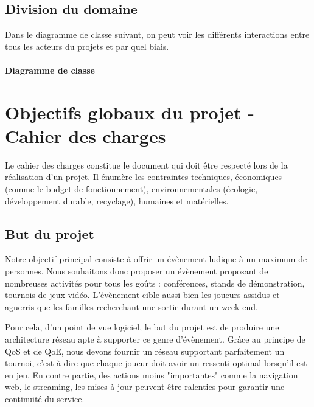 \documentclass[french]{article}
\begin{document}

\subsection{Division du domaine}

Dans le diagramme de classe suivant, on peut voir les différents interactions entre tous les acteurs du projets et par quel biais.

\paragraph{Diagramme de classe}



\newpage
\section{Objectifs globaux du projet - Cahier des charges}

Le cahier des charges constitue le document qui doit être respecté lors de la réalisation d'un projet. Il énumère les contraintes techniques, économiques (comme le budget de fonctionnement), environnementales (écologie, développement durable, recyclage), humaines et matérielles.

\subsection{But du projet}

Notre objectif principal consiste à offrir un évènement ludique à un maximum de personnes. Nous souhaitons donc proposer un évènement proposant de nombreuses activités pour tous les goûts : conférences, stands de démonstration, tournois de jeux vidéo. L'évènement cible aussi bien les joueurs assidus et aguerris que les familles recherchant une sortie durant un week-end.

Pour cela, d'un point de vue logiciel, le but du projet est de produire une architecture réseau apte à supporter ce genre d'évènement. Grâce au principe de QoS et de QoE, nous devons fournir un réseau supportant parfaitement un tournoi, c'est à dire que chaque joueur doit avoir un ressenti optimal lorsqu'il est en jeu. En contre partie, des actions moins "importantes" comme la navigation web, le streaming, les mises à jour peuvent être ralenties pour garantir une continuité du service.
\end{document}
